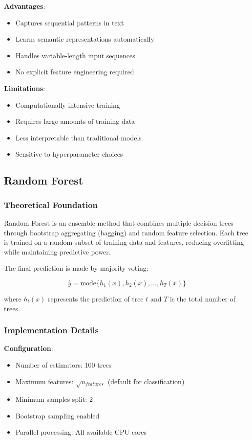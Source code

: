 \documentclass[11pt,a4paper]{article}
\begin{document}
\textbf{Advantages}:
\begin{itemize}
    \item Captures sequential patterns in text
    \item Learns semantic representations automatically
    \item Handles variable-length input sequences
    \item No explicit feature engineering required
\end{itemize}

\textbf{Limitations}:
\begin{itemize}
    \item Computationally intensive training
    \item Requires large amounts of training data
    \item Less interpretable than traditional models
    \item Sensitive to hyperparameter choices
\end{itemize}

\subsection{Random Forest}

\subsubsection{Theoretical Foundation}

Random Forest is an ensemble method that combines multiple decision trees through bootstrap aggregating (bagging) and random feature selection. Each tree is trained on a random subset of training data and features, reducing overfitting while maintaining predictive power.

The final prediction is made by majority voting:

\begin{equation}
\hat{y} = \text{mode}\{h_1(x), h_2(x), ..., h_T(x)\}
\end{equation}

where $h_t(x)$ represents the prediction of tree $t$ and $T$ is the total number of trees.

\subsubsection{Implementation Details}

\textbf{Configuration}:
\begin{itemize}
    \item Number of estimators: 100 trees
    \item Maximum features: $\sqrt{n_{features}}$ (default for classification)
    \item Minimum samples split: 2
    \item Bootstrap sampling enabled
    \item Parallel processing: All available CPU cores
\end{itemize}
\end{document}
